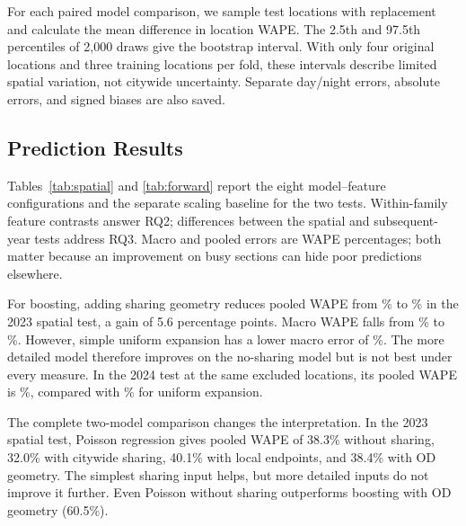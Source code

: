 \documentclass{interact}
\begin{document}
For each paired model comparison, we sample test locations with replacement and calculate the mean difference in location WAPE. The 2.5th and 97.5th percentiles of 2,000 draws give the bootstrap interval. With only four original locations and three training locations per fold, these intervals describe limited spatial variation, not citywide uncertainty. Separate day/night errors, absolute errors, and signed biases are also saved.

\subsection{Prediction Results}
\label{sec:results}
Tables~\ref{tab:spatial} and \ref{tab:forward} report the eight model--feature configurations and the separate scaling baseline for the two tests. Within-family feature contrasts answer RQ2; differences between the spatial and subsequent-year tests address RQ3. Macro and pooled errors are WAPE percentages; both matter because an improvement on busy sections can hide poor predictions elsewhere.

\begin{table}[t]
\caption{Prediction at excluded locations in 2023. Each model trains on the other three locations. WAPE is in percent. Macro weights locations equally; pooled weights them by observed traffic. $S$ counts test locations.}
\label{tab:spatial}\centering\footnotesize
\end{table}
\begin{table}[t]
\caption{Prediction at excluded locations in 2024, without refitting the 2023 models. WAPE is in percent. Macro weights locations equally; pooled weights them by observed traffic. Sharing and weather are observed for each test period.}
\label{tab:forward}\centering\footnotesize
\end{table}
For boosting, adding sharing geometry reduces pooled WAPE from \SpatialBasePooled\%{} to \SpatialChordPooled\%{} in the 2023 spatial test, a gain of 5.6 percentage points. Macro WAPE falls from \SpatialBaseMacro\%{} to \SpatialChordMacro\%. However, simple uniform expansion has a lower macro error of \SpatialUniformMacro\%{}. The more detailed model therefore improves on the no-sharing model but is not best under every measure. In the 2024 test at the same excluded locations, its pooled WAPE is \ForwardChordPooled\%{}, compared with \ForwardUniformPooled\%{} for uniform expansion.

The complete two-model comparison changes the interpretation. In the 2023 spatial test, Poisson regression gives pooled WAPE of 38.3\%{} without sharing, 32.0\%{} with citywide sharing, 40.1\%{} with local endpoints, and 38.4\%{} with OD geometry. The simplest sharing input helps, but more detailed inputs do not improve it further. Even Poisson without sharing outperforms boosting with OD geometry (60.5\%).
\end{document}
